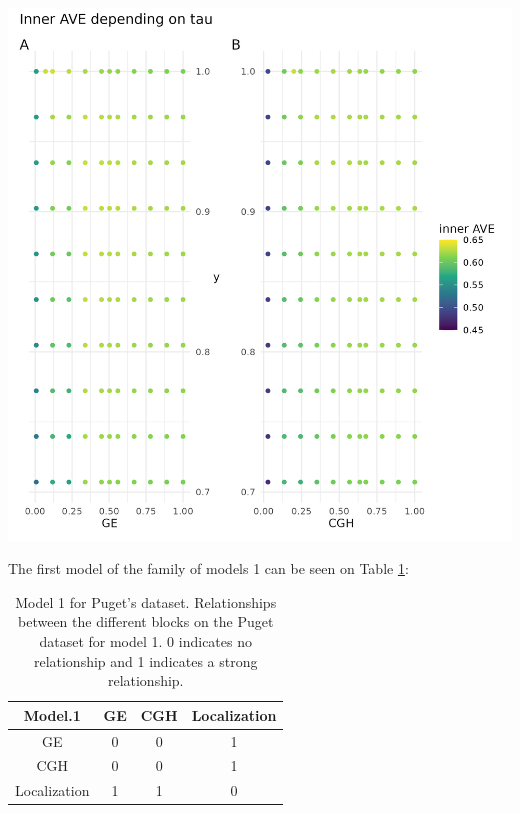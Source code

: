 \documentclass[
  a4paper,
]{book}
\let\origfigure\figure
\let\endorigfigure\endfigure
\renewenvironment{figure}[1][2] {
    \expandafter\origfigure\expandafter[!ht]
} {
    \endorigfigure
}
\begin{document}
\begin{figure}
\includegraphics[width=1\linewidth]{images/pugets_tau_to_AVE} \caption[Effect of tau on the inner AVE on Puget's dataset.]{Effect of tau on the inner AVE on Puget's dataset. The suggested tau value is the column between the regular grid, on the ordinate axis the y's tau values and on the abscissa the gene expression (GE) on the left and the comparative genomic hybridization (CGH) on the right. The highest inner AVE is with high tau values for y and middle to upper values for GE and CGH.}\label{fig:puget-tau2AVE}
\end{figure}

The first model of the family of models 1 can be seen on Table \ref{tab:Puget-model1}:

\begin{table}

\caption[Model 1 for Puget's dataset.]{\label{tab:Puget-model1}Model 1 for Puget's dataset. Relationships between the different blocks on the Puget dataset for model 1. 0 indicates no relationship and 1 indicates a strong relationship.}
\centering
\begin{tabular}[t]{c|c|c|c}
\hline
Model.1 & GE & CGH & Localization\\
\hline
GE & 0 & 0 & 1\\
\hline
CGH & 0 & 0 & 1\\
\hline
Localization & 1 & 1 & 0\\
\hline
\end{tabular}
\end{table}
\end{document}
